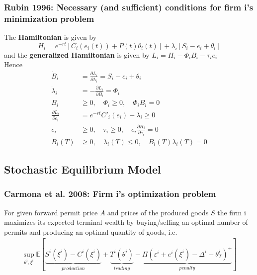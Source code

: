 \begin{frame}
\frametitle{Rubin 1996: Necessary (and sufficient) conditions for firm i's minimization problem}
\begin{tiny}
The \textbf{Hamiltonian} is given by
\[
H_i = e^{-rt} [C_i(e_i(t)) + P(t)\theta_i(t)] + \lambda_i[S_i - e_i + \theta_i]
\]
and the \textbf{generalized Hamiltonian} is given by
$
L_i = H_i  - \Phi_i B_i - \tau_i e_i
$ \\
Hence
\begin{align}
\dot{B}_i &= \frac{\partial L_i}{\partial \lambda_i} = S_i - e_i + \theta_i \\
\dot{\lambda}_i &= -\frac{\partial L_i}{\partial B_i} = \Phi_i \\
B_i &\ge 0, \quad \Phi_i \ge 0, \quad \Phi_i B_i = 0 \\
\frac{\partial L_i}{\partial e_i} &= e^{-rt}C'_i(e_i) - \lambda_i \ge 0 \\
e_i &\ge 0, \quad \tau_i \ge 0, \quad e_i \frac{\partial H_i}{\partial e_i} = 0 \\
B_i(T) &\ge 0, \quad \lambda_i(T) \le 0, \quad B_i(T) \lambda_i(T) = 0
\end{align}
\end{tiny}
\end{frame}

\subsection{Stochastic Equilibrium Model}
\begin{frame}
\frametitle{Carmona et al. 2008: Firm i's optimization problem}
For given forward permit price $A$ and prices of the produced goods $S$ the firm i maximizes its expected terminal wealth by  buying/selling an optimal number of permits and producing an optimal quantity of goods, i.e.
\begin{align}
\sup_{\theta^i, \xi^i} \mathbb{E} \left[ \underbrace{S^i(\xi^i) - C^i(\xi^i)}_{production} + \underbrace{T^i(\theta^i)}_{trading} - \underbrace{\Pi \left(\varepsilon^i + e^i(\xi^i) - \Delta^i - \theta^i_T \right)^+}_{penalty} \right]
\end{align}
\end{frame}


